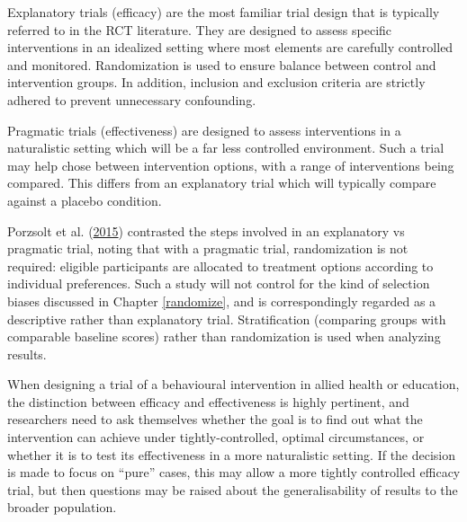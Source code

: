 \documentclass{krantz}
\begin{document}
Explanatory trials (efficacy) are the most familiar trial design that is typically referred to in the RCT literature. They are designed to assess specific interventions in an idealized setting where most elements are carefully controlled and monitored. Randomization is used to ensure balance between control and intervention groups. In addition, inclusion and exclusion criteria are strictly adhered to prevent unnecessary confounding.

Pragmatic trials (effectiveness) are designed to assess interventions in a naturalistic setting which will be a far less controlled environment. Such a trial may help chose between intervention options, with a range of interventions being compared. This differs from an explanatory trial which will typically compare against a placebo condition.

Porzsolt et al. (\protect\hyperlink{ref-porzsolt2015}{2015}) contrasted the steps involved in an explanatory vs pragmatic trial, noting that with a pragmatic trial, randomization is not required: eligible participants are allocated to treatment options according to individual preferences. Such a study will not control for the kind of selection biases discussed in Chapter \ref{randomize}, and is correspondingly regarded as a descriptive rather than explanatory trial. Stratification (comparing groups with comparable baseline scores) rather than randomization is used when analyzing results. 

When designing a trial of a behavioural intervention in allied health or education, the distinction between efficacy and effectiveness is highly pertinent, and researchers need to ask themselves whether the goal is to find out what the intervention can achieve under tightly-controlled, optimal circumstances, or whether it is to test its effectiveness in a more naturalistic setting. If the decision is made to focus on ``pure'' cases, this may allow a more tightly controlled efficacy trial, but then questions may be raised about the generalisability of results to the broader population.
\end{document}
